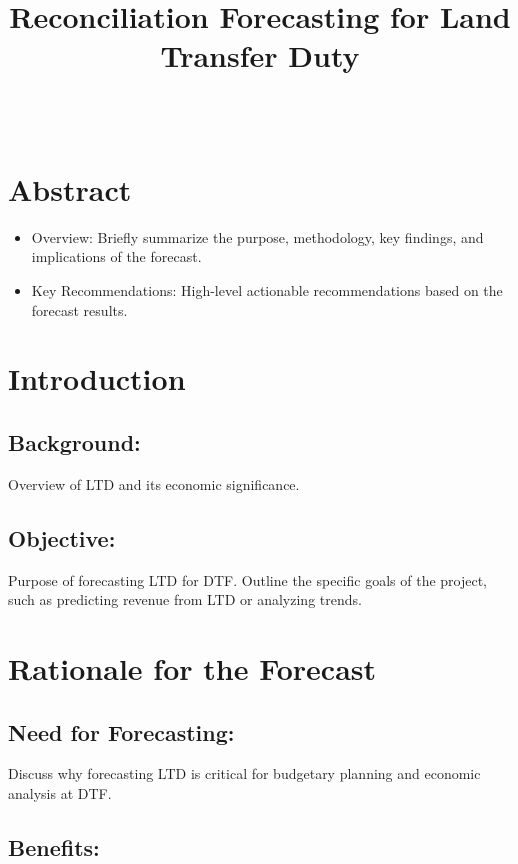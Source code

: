 \documentclass[11pt,a4paper,]{article}
\title{Reconciliation Forecasting for Land Transfer Duty}
\author{\sf{\Large\textbf{Hoang Do}\\\large \\[0.5cm]}}
\date{\sf\Date~\Month~\Year}
\makeatletter
\providecommand{\tightlist}{%
  \setlength{\itemsep}{0pt}\setlength{\parskip}{0pt}}
\def\titlepage{\front{\expandafter{\@title}}{\@author}{\@organization}}
\makeatother
\begin{document}
\titlepage

{
\setcounter{tocdepth}{2}
\tableofcontents
}
\section{Abstract}\label{abstract}

\begin{itemize}
\tightlist
\item
  Overview: Briefly summarize the purpose, methodology, key findings, and implications of the forecast.
\item
  Key Recommendations: High-level actionable recommendations based on the forecast results.
\end{itemize}

\section{Introduction}\label{introduction}

\subsection{Background:}\label{background}

Overview of LTD and its economic significance.

\subsection{Objective:}\label{objective}

Purpose of forecasting LTD for DTF. Outline the specific goals of the project, such as predicting revenue from LTD or analyzing trends.

\section{Rationale for the Forecast}\label{rationale-for-the-forecast}

\subsection{Need for Forecasting:}\label{need-for-forecasting}

Discuss why forecasting LTD is critical for budgetary planning and economic analysis at DTF.

\subsection{Benefits:}\label{benefits}
\end{document}
